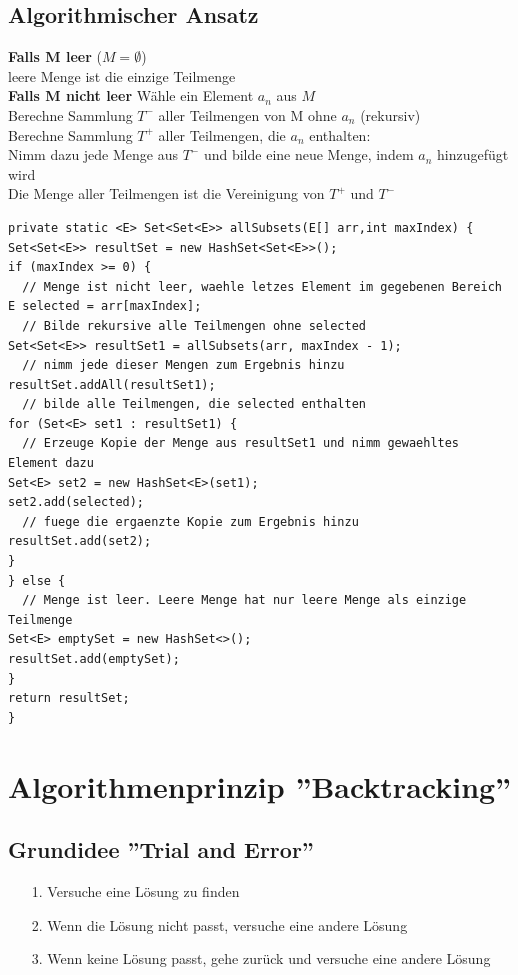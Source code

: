 \documentclass{scrreprt}
\newcommand\tab[1][1cm]{\hspace*{#1}}
\begin{document}
\subsection{Algorithmischer Ansatz}
\textbf{Falls M leer} ($M = \emptyset$)
\\\tab leere Menge ist die einzige Teilmenge
\\\textbf{Falls M nicht leer} Wähle ein Element $a_n$ aus $M$
\\\tab Berechne Sammlung $T^-$ aller Teilmengen von M ohne $a_n$ (rekursiv)
\\\tab Berechne Sammlung $T^+$ aller Teilmengen, die $a_n$ enthalten:
\\\tab Nimm dazu jede Menge aus $T^-$ und bilde eine neue Menge, indem $a_n$ hinzugefügt wird
\\\tab Die Menge aller Teilmengen ist die Vereinigung von $T^+$ und $T^-$
\\\begin{lstlisting}
private static <E> Set<Set<E>> allSubsets(E[] arr,int maxIndex) {
Set<Set<E>> resultSet = new HashSet<Set<E>>();
if (maxIndex >= 0) {
  // Menge ist nicht leer, waehle letzes Element im gegebenen Bereich
E selected = arr[maxIndex];
  // Bilde rekursive alle Teilmengen ohne selected
Set<Set<E>> resultSet1 = allSubsets(arr, maxIndex - 1);
  // nimm jede dieser Mengen zum Ergebnis hinzu
resultSet.addAll(resultSet1);
  // bilde alle Teilmengen, die selected enthalten
for (Set<E> set1 : resultSet1) {
  // Erzeuge Kopie der Menge aus resultSet1 und nimm gewaehltes Element dazu
Set<E> set2 = new HashSet<E>(set1);
set2.add(selected);
  // fuege die ergaenzte Kopie zum Ergebnis hinzu
resultSet.add(set2);
}
} else {
  // Menge ist leer. Leere Menge hat nur leere Menge als einzige Teilmenge
Set<E> emptySet = new HashSet<>();
resultSet.add(emptySet);
}
return resultSet;
}
\end{lstlisting}
\section{Algorithmenprinzip ''Backtracking''}
\subsection{Grundidee ''Trial and Error''} 
\begin{itemize}
  \item [1.] Versuche eine Lösung zu finden
  \item [2.] Wenn die Lösung nicht passt, versuche eine andere Lösung
  \item [3.] Wenn keine Lösung passt, gehe zurück und versuche eine andere Lösung
\end{itemize}
\end{document}
